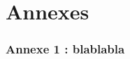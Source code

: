 \documentclass[a4paper,12pt]{article} %
\begin{document}
\renewcommand\partname{}
\part{Annexes}
	\section*{Annexe 1 : blablabla}

\begin{figure}
\begin{center}
\end{center}
\end{figure}
\end{document}
